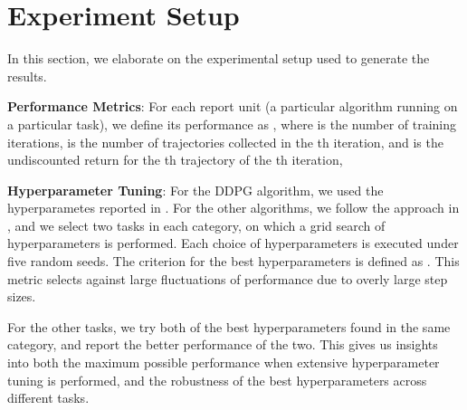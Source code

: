 \documentclass{article}
\begin{document}
\section{Experiment Setup}

In this section, we elaborate on the experimental setup used to generate the results.

{\bf Performance Metrics}: For each report unit (a particular algorithm running on a particular task), we define its performance as , where  is the number of training iterations,  is the number of trajectories collected in the th iteration, and  is the undiscounted return for the th trajectory of the th iteration,


{\bf Hyperparameter Tuning}: For the DDPG algorithm, we used the hyperparametes reported in \citet{Lillicrap15}. For the other algorithms, we follow the approach in \cite{Mnih15}, and we select two tasks in each category, on which a grid search of hyperparameters is performed. Each choice of hyperparameters is executed under five random seeds. The criterion for the best hyperparameters is defined as . This metric selects against large fluctuations of performance due to overly large step sizes. 

For the other tasks, we try both of the best hyperparameters found in the same category, and report the better performance of the two. This gives us insights into both the maximum possible performance when extensive hyperparameter tuning is performed, and the robustness of the best hyperparameters across different tasks.
\end{document}
